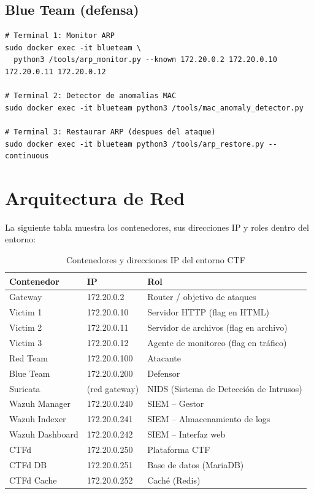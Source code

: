 \documentclass[12pt,a4paper]{article}
\begin{document}
\subsection{Blue Team (defensa)}

\begin{lstlisting}
# Terminal 1: Monitor ARP
sudo docker exec -it blueteam \
  python3 /tools/arp_monitor.py --known 172.20.0.2 172.20.0.10 172.20.0.11 172.20.0.12

# Terminal 2: Detector de anomalias MAC
sudo docker exec -it blueteam python3 /tools/mac_anomaly_detector.py

# Terminal 3: Restaurar ARP (despues del ataque)
sudo docker exec -it blueteam python3 /tools/arp_restore.py --continuous
\end{lstlisting}

\section{Arquitectura de Red}

La siguiente tabla muestra los contenedores, sus direcciones IP y roles dentro del entorno:

\begin{table}[h!]
\centering
\begin{tabular}{@{}llp{7cm}@{}}
\toprule
\textbf{Contenedor} & \textbf{IP} & \textbf{Rol} \\
\midrule
Gateway         & 172.20.0.2   & Router / objetivo de ataques \\
Victim 1        & 172.20.0.10  & Servidor HTTP (flag en HTML) \\
Victim 2        & 172.20.0.11  & Servidor de archivos (flag en archivo) \\
Victim 3        & 172.20.0.12  & Agente de monitoreo (flag en tr\'afico) \\
Red Team        & 172.20.0.100 & Atacante \\
Blue Team       & 172.20.0.200 & Defensor \\
Suricata        & (red gateway) & NIDS (Sistema de Detecci\'on de Intrusos) \\
Wazuh Manager   & 172.20.0.240 & SIEM -- Gestor \\
Wazuh Indexer   & 172.20.0.241 & SIEM -- Almacenamiento de logs \\
Wazuh Dashboard & 172.20.0.242 & SIEM -- Interfaz web \\
CTFd            & 172.20.0.250 & Plataforma CTF \\
CTFd DB         & 172.20.0.251 & Base de datos (MariaDB) \\
CTFd Cache      & 172.20.0.252 & Cach\'e (Redis) \\
\bottomrule
\end{tabular}
\caption{Contenedores y direcciones IP del entorno CTF}
\end{table}
\end{document}
